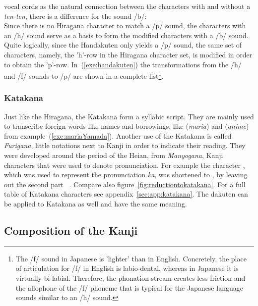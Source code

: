 vocal cords as the natural connection between the characters with and without 
a \emph{ten-ten}, there is a difference for the sound /b/:\\
Since there is no Hiragana character to match a /p/ sound, the characters with
an /h/ sound serve as a basis to form the modified characters with a /b/ sound.
Quite logically, since the Handakuten only yields a /p/ sound, the same set of
characters, namely, the 'h'-row in the Hiragana character set, is modified in 
order to obtain the 'p'-row. In~(\ref{exe:handakuten}) the transformations from 
the /h/ and /f/ sounds to /p/ are shown in a complete list\footnote{
The /f/ sound in Japanese is 'lighter' than in English. Concretely, the place of
articulation for /f/ in English is labio-dental, whereas in Japanese it is 
virtually bi-labial. Therefore, the phonation stream creates less friction and
the allophone of the /f/ phoneme that is typical for the Japanese language sounds
similar to an /h/ sound.}.

\subsubsection{Katakana }
\label{sec:katakana}

Just like the Hiragana, the Katakana form a syllabic script. They are mainly used
to transcribe foreign words like names and borrowings, like 
(\emph{maria}) and  (\emph{anime}) from 
example~(\ref{exe:mariaYamada}). Another use of the Katakana is called 
\emph{Furigana}, little notations next to Kanji in order to indicate their 
reading. They were developed around the period of the Heian, from 
\emph{Manyogana}, Kanji characters that were used to denote pronunciation.
For example the character , which was used to represent the pronunciation
\emph{ka}, was shortened to , by leaving out the second part 
~. Compare also figure~\ref{fig:reductiontokatakana}. For a full table of Katakana characters see 
appendix~\ref{sec:app:katakana}. The dakuten can be applied to Katakana as well 
and have the same meaning.

\subsection{Composition of the Kanji }
\label{sec:compositionofKanji}

